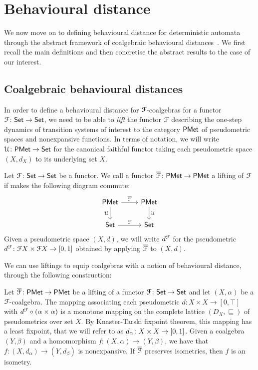 \section{Behavioural distance}\label{c2:sec:behavioural_distance}
We now move on to defining behavioural distance for deterministic automata through the abstract framework of coalgebraic behavioural distances~\cite{Baldan:2018:Coalgebraic}. We first recall the main definitions and then concretise the abstract results to the case of our interest.
\subsection{Coalgebraic behavioural distances}\label{c2:subsec:coalgebraic_behavioural_distances}
In order to define a behavioural distance for $\mathcal{F}$-coalgebras for a functor $\mathcal{F} \colon {\mathsf{Set}} \to {\mathsf{Set}}$, we need to be able to \emph{lift} the functor $\mathcal{F}$ describing the one-step dynamics of transition systems of interest to the category $\mathsf{PMet}$ of pseudometric spaces and nonexpansive functions. In terms of notation, we will write $\mathcal{U} \colon \mathsf{PMet} \to {\mathsf{Set}}$ for the canonical faithful functor taking each pseudometric space $(X, d_X)$ to its underlying set $X$.
\begin{definition}\label{c2:def:lifting}
	Let $\mathcal{F} \colon {\mathsf{Set}} \to {\mathsf{Set}}$ be a functor. We call a functor $\overline{\mathcal{F}} \colon \mathsf{PMet} \to \mathsf{PMet}$ a lifting of $\mathcal{F}$ if makes the following diagram commute:
\[\begin{tikzcd}
	\PMet & \PMet \\
	\Set & \Set
	\arrow["{\overline{\funF}}", from=1-1, to=1-2]
	\arrow["\forget"', from=1-1, to=2-1]
	\arrow["\forget", from=1-2, to=2-2]
	\arrow["\funF", from=2-1, to=2-2]
\end{tikzcd}\]
Given a pseudometric space $(X, d)$, we will write $d^{\mathcal{F}}$ for the pseudometric $d^{\funF} \colon \funF X \times \funF X \to \interval{0}{1}$ obtained by applying $\overline{\mathcal{F}}$ to $(X,d)$.
\end{definition}
We can use liftings to equip coalgebras with a notion of behavioural distance, through the following construction:
\begin{lemma}\label{c2:lem:behavioural_distances}
	Let $\overline{\mathcal{F}} \colon \mathsf{PMet} \to \mathsf{PMet}$ be a lifting of a functor $\mathcal{F} \colon {\mathsf{Set}} \to {\mathsf{Set}}$ and let $(X, \alpha)$ be a $\mathcal{F}$-coalgebra. The mapping associating each pseudometric $d \colon X \times X \to [0,\top]$ with $d^{\mathcal{F}} \circ (\alpha \times \alpha)$ is a monotone mapping on the complete lattice $(D_X, \sqsubseteq)$ of pseudometrics over set $X$. By Knaster-Tarski fixpoint theorem, this mapping has a least fixpoint, that we will refer to as $d_\alpha \colon X \times X \to \interval{0}{1}$. Given a coalgebra $(Y, \beta)$ and a homomorphism $f \colon (X, \alpha) \to (Y, \beta)$, we have that $f \colon (X, d_\alpha) \to (Y, d_\beta)$ is nonexpansive. If $\overline{\mathcal{F}}$ preserves isometries, then $f$ is an isometry.
\end{lemma}
